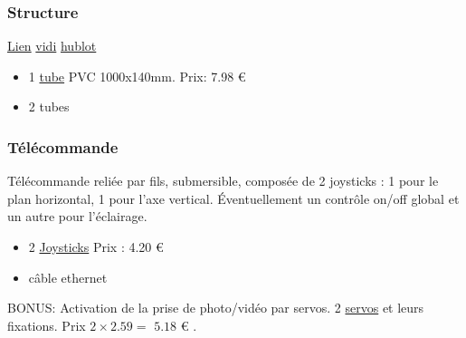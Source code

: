 \documentclass[11pt,a4paper]{article}
\newcommand{\PAYE}{{\Large\color{orange}\checkmark}}
\newcommand{\RECU}{{\Large\color{green}\checkmark}}
\begin{document}
        
        
        
        
      \subsubsection{Structure}
      
        \href{http://www.sitakiki.fr/modnaval/tuby.htm}{Lien}
        \href{http://explobotique.free.fr/vidi1/vidi1_detail3.htm}{vidi}
        \href{http://explobotique.free.fr/ptipi/realisation_hublot.htm}{hublot}
        \begin{itemize}
          \item 1 \href{http://www.pointp.fr/gros-oeuvre-vrd-tp/tube-pvc-sotrabat-nf-me-gris-diametre-140mm-longueur-4m-eu-ep-A3890917p213S2R2m23}{tube} PVC 1000x140mm. Prix: {\color{red}7.98 €}
          \item 2 tubes 
        \end{itemize}

      
      \subsubsection{Télécommande  \PAYE}
        Télécommande reliée par fils, submersible, composée de 2 joysticks : 1 pour le plan horizontal, 1 pour l'axe vertical. Éventuellement un contrôle on/off global et un autre pour l'éclairage.\\
        \begin{itemize}
          \item 2 \href{http://www.ebay.co.uk/itm/Analogue-Joystick-Controller-5V-With-Click-Button-Arduino-PI-Compatible-/191608236635?}{Joysticks} Prix : {\color{red} 4.20 €} \PAYE
          \item câble ethernet \RECU
        \end{itemize}


        BONUS: Activation de la prise de photo/vidéo par servos. 2 \href{http://www.miniinthebox.com/fr/mini-servo-9g-avec-accessoires-bleu-translucide_p638990.html?litb_from=sysmail}{servos} et leurs fixations. Prix $2\times 2.59=$ {\color{red}$5.18$ €} \PAYE.
      
\end{document}
